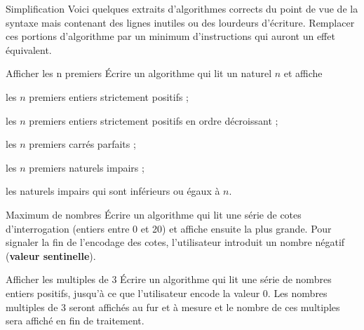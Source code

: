 \begin{Exercice}{Simplification}
	Voici quelques extraits d’algorithmes corrects du point de vue de la
	syntaxe mais contenant des lignes inutiles ou des lourdeurs d’écriture.
	Remplacer ces portions d’algorithme par un minimum d’instructions qui
	auront un effet équivalent.




\end{Exercice}

\begin{Exercice}{Afficher les n premiers}
	Écrire un algorithme qui lit un naturel $n$ et affiche
	
	\begin{liste}
	\item {
	les $n$ premiers entiers strictement positifs ;}
	\item {
	les $n$ premiers entiers strictement positifs en ordre décroissant ;}
	\item {
	les $n$ premiers carrés parfaits ;}
	\item {
	les $n$ premiers naturels impairs ;}
	\item {
	les naturels impairs qui sont inférieurs ou égaux à $n$.}
	\end{liste}
\end{Exercice}

\begin{Exercice}{Maximum de nombres}
	Écrire un algorithme qui lit une série de cotes d’interrogation (entiers
	entre 0 et 20) et affiche ensuite la plus grande. Pour signaler la fin
	de l’encodage des cotes, l’utilisateur introduit un nombre négatif
	(\textbf{valeur sentinelle}).
\end{Exercice}

\begin{Exercice}{Afficher les multiples de 3}
	Écrire un algorithme qui lit une série de nombres entiers positifs,
	jusqu’à ce que l’utilisateur encode la valeur 0. Les nombres multiples
	de 3 seront affichés au fur et à mesure et le nombre de ces multiples
	sera affiché en fin de traitement.
\end{Exercice}

